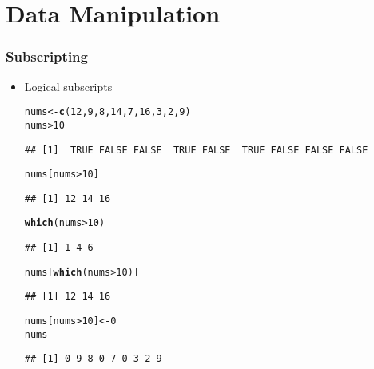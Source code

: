 \documentclass[paper=screen,mathserif]{beamer}\usepackage[]{graphicx}\usepackage[]{color}
\makeatletter
\newcommand{\hlnum}[1]{\textcolor[rgb]{0.686,0.059,0.569}{#1}}%
\newcommand{\hlopt}[1]{\textcolor[rgb]{0,0,0}{#1}}%
\newcommand{\hlstd}[1]{\textcolor[rgb]{0.345,0.345,0.345}{#1}}%
\newcommand{\hlkwb}[1]{\textcolor[rgb]{0.69,0.353,0.396}{#1}}%
\newcommand{\hlkwd}[1]{\textcolor[rgb]{0.737,0.353,0.396}{\textbf{#1}}}%
\newenvironment{kframe}{%
 \def\at@end@of@kframe{}%
 \ifinner\ifhmode%
  \def\at@end@of@kframe{\end{minipage}}%
  \begin{minipage}{\columnwidth}%
 \fi\fi%
 \def\FrameCommand##1{\hskip\@totalleftmargin \hskip-\fboxsep
 \colorbox{shadecolor}{##1}\hskip-\fboxsep
     \hskip-\linewidth \hskip-\@totalleftmargin \hskip\columnwidth}%
 \MakeFramed {\advance\hsize-\width
   \@totalleftmargin\z@ \linewidth\hsize
   \@setminipage}}%
 {\par\unskip\endMakeFramed%
 \at@end@of@kframe}
\newenvironment{knitrout}{}{} %
\newcommand{\ft}[1]{\frametitle{#1}}
\makeatother
\begin{document}
\section{Data Manipulation}

\begin{frame}[fragile]
  \ft{Subscripting}
  
  \begin{itemize}
  \item Logical subscripts
\begin{knitrout}\scriptsize
{}\color{fgcolor}\begin{kframe}
\begin{alltt}
\hlstd{nums} \hlkwb{<-} \hlkwd{c}\hlstd{(}\hlnum{12}\hlstd{,} \hlnum{9}\hlstd{,} \hlnum{8}\hlstd{,} \hlnum{14}\hlstd{,} \hlnum{7}\hlstd{,} \hlnum{16}\hlstd{,} \hlnum{3}\hlstd{,} \hlnum{2}\hlstd{,} \hlnum{9}\hlstd{)}
\hlstd{nums} \hlopt{>} \hlnum{10}
\end{alltt}
\begin{verbatim}
## [1]  TRUE FALSE FALSE  TRUE FALSE  TRUE FALSE FALSE FALSE
\end{verbatim}
\end{kframe}
\end{knitrout}

\begin{knitrout}\scriptsize
{}\color{fgcolor}\begin{kframe}
\begin{alltt}
\hlstd{nums[nums} \hlopt{>} \hlnum{10}\hlstd{]}
\end{alltt}
\begin{verbatim}
## [1] 12 14 16
\end{verbatim}
\begin{alltt}
\hlkwd{which}\hlstd{(nums} \hlopt{>} \hlnum{10}\hlstd{)}
\end{alltt}
\begin{verbatim}
## [1] 1 4 6
\end{verbatim}
\begin{alltt}
\hlstd{nums[}\hlkwd{which}\hlstd{(nums} \hlopt{>} \hlnum{10}\hlstd{)]}
\end{alltt}
\begin{verbatim}
## [1] 12 14 16
\end{verbatim}
\end{kframe}
\end{knitrout}
 
\begin{knitrout}\scriptsize
{}\color{fgcolor}\begin{kframe}
\begin{alltt}
\hlstd{nums[nums} \hlopt{>} \hlnum{10}\hlstd{]} \hlkwb{<-} \hlnum{0}
\hlstd{nums}
\end{alltt}
\begin{verbatim}
## [1] 0 9 8 0 7 0 3 2 9
\end{verbatim}
\end{kframe}
\end{knitrout}


\end{itemize}
\end{frame}
\end{document}
